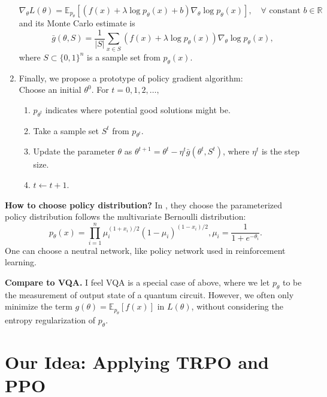 \documentclass[
        11pt, %
	a4paper, %
]{LegrandOrangeBook}
\begin{document}
\begin{enumerate}
\begin{equation}
    \nabla_{\theta} L(\theta)=\mathbb{E}_{p_{\theta}}[(f(x)+\lambda \log p_{\theta}(x) + b ) \nabla_{\theta} \log p_{\theta}(x)], \quad \forall \text{ constant } b \in \mathbb{R}
\end{equation}
and its Monte Carlo estimate is
\begin{equation}
    \bar{g}(\theta, S) = \frac{1}{|S|}\sum_{x \in S} (f(x)+\lambda \log p_\theta(x)) \nabla_\theta \log p_\theta(x),
\end{equation}
where $S \subset \{0,1\}^n$ is a sample set from $p_\theta(x)$.
    \item Finally, we propose a prototype of policy gradient algorithm: \\
Choose an initial $\theta^{0}$. For $t=0,1,2,\dots,$
    \begin{enumerate}
    \item $p_{\theta^{t}}$ indicates where potential good solutions might be.
    \item Take a sample set $S^{t}$ from $p_{\theta^{t}}$.
    \item Update the parameter $\theta$ as $\theta^{t+1}=\theta^t-\eta^t \bar{g}\left(\theta^t, S^t\right)$, where $\eta^t$ is the step size.
    \item $t \leftarrow t+1.$
    \end{enumerate}
\end{enumerate}

\textbf{How to choose policy distribution?}
In \cite{chen2023monte}, they choose the parameterized policy distribution follows the multivariate Bernoulli distribution:
\begin{equation}
    p_\theta(x)=\prod_{i=1}^n \mu_i^{\left(1+x_i\right) / 2}\left(1-\mu_i\right)^{\left(1-x_i\right) / 2}, \mu_i=\frac{1}{1+e^{-\theta_i}}.
\end{equation}
One can choose a neutral network, like policy network used in reinforcement learning.

\textbf{Compare to VQA.}
I feel VQA is a special case of above, where we let $p_{\theta}$ to be the measurement of output state of a quantum circuit. However, we often only minimize the term $g(\theta)=\mathbb{E}_{p_\theta}[f(x)]$  in $L(\theta)$, without considering the entropy regularization of $p_\theta$.

\section{Our Idea: Applying TRPO and PPO}
\end{document}

